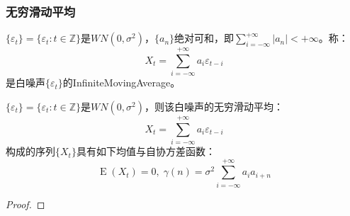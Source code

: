\subsubsection{无穷滑动平均}
\begin{definition}
	$\{\varepsilon_t\}=\{\varepsilon_t:t\in\mathbb{Z}\}$是$WN(0,\sigma^2)$，$\{a_n\}$绝对可和，即$\sum\limits_{i=-\infty}^{+\infty}|a_n|<+\infty$。称：
	\begin{equation*}
		X_t=\sum_{i=-\infty}^{+\infty}a_i\varepsilon_{t-i}
	\end{equation*}
	是白噪声$\{\varepsilon_t\}$的\gls{InfiniteMovingAverage}。
\end{definition}
\begin{theorem}
	$\{\varepsilon_t\}=\{\varepsilon_t:t\in\mathbb{Z}\}$是$WN(0,\sigma^2)$，则该白噪声的无穷滑动平均：
	\begin{equation*}
		X_t=\sum_{i=-\infty}^{+\infty}a_i\varepsilon_{t-i}
	\end{equation*}
	构成的序列$\{X_t\}$具有如下均值与自协方差函数：
	\begin{equation*}
		\operatorname{E}(X_t)=0,\;\gamma(n)=\sigma^2\sum_{i=-\infty}^{+\infty}a_ia_{i+n}
	\end{equation*}
\end{theorem}
\begin{proof}
	
\end{proof}
